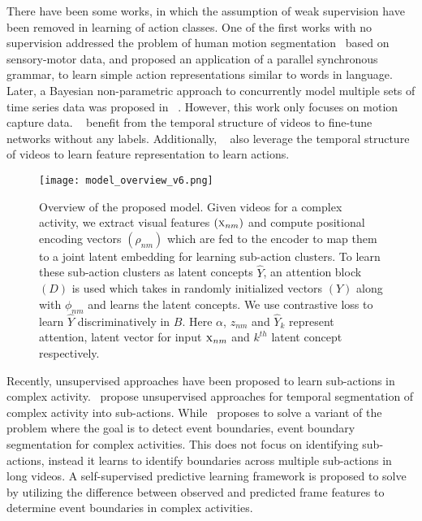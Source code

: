 \documentclass[final]{cvpr}
\begin{document}
\par There have been some works, in which the assumption of  weak supervision have been removed in learning of action classes. One of the first works with no supervision addressed the problem of human motion segmentation~\cite{rl-u-guerra2007language} based on sensory-motor data, and proposed an application of a parallel synchronous grammar,  to learn simple action representations similar to words in language. Later,   a Bayesian non-parametric approach to concurrently model multiple sets of time series data was proposed in ~\cite{rl-u-fox2014joint}. However, this work only focuses on motion capture data. ~\cite{rl-u-wang2015unsupervised, brattoli2017lstm}  benefit from the temporal structure of videos to fine-tune networks without any labels. Additionally, ~\cite{rl-ua-ramanathan2015learning, rl-ua-fernando2015modeling, rl-ua-cherian2017generalized, rl-ua-lee2017unsupervised} also leverage the temporal structure of videos to learn feature representation to learn actions. 


\begin{figure*}[t]
  \texttt{[image: model\_overview\_v6.png]}
\caption{{\small Overview of the proposed model. Given videos for a complex activity, we extract visual features $(\textsc{x}_{nm})$ and compute positional encoding vectors $(\rho_{nm})$ which are fed to the encoder to map them to a joint latent embedding for learning sub-action clusters. To learn these sub-action clusters as latent concepts $\widehat{Y}$, an attention block $(D)$ is used which takes in randomly initialized vectors $(Y)$ along with $\phi_{nm}$ and learns the latent concepts. We use contrastive loss to learn $\widehat{Y}$ discriminatively in $B$. Here $\alpha$, $z_{nm}$ and $\widehat{Y}_{k}$ represent attention, latent vector for input $\textsc{x}_{nm}$ and $k^{th}$ latent concept respectively.
}}
\vspace{-0.4cm}
\label{fig:arch}
\end{figure*}

\par Recently, unsupervised approaches have been proposed to learn sub-actions in complex activity.~\cite{sener2018unsupervised, kukleva2019unsupervised, vidalmata2020joint} propose unsupervised approaches for temporal segmentation of complex activity into sub-actions. While~\cite{aakur2019perceptual} proposes to solve a variant of the problem where the goal is to detect event boundaries, \ie event boundary segmentation for complex activities. This does not focus on identifying sub-actions, instead it learns to identify boundaries across multiple sub-actions in long videos. 
A self-supervised predictive learning framework is proposed to solve by utilizing the difference between observed and predicted frame features to determine event boundaries in complex activities.
\end{document}

